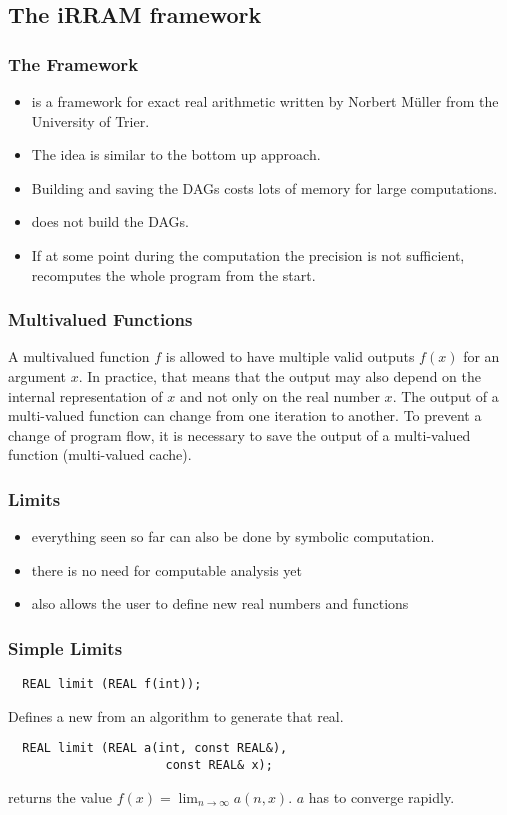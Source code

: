 \subsection{The iRRAM framework}
\begin{frame}
  \frametitle{The \irram Framework}
  \begin{itemize}[<+->]
    \item \irram is a \cc framework for exact real arithmetic written by Norbert M\"{u}ller from the University of Trier.
      \item The idea is similar to the bottom up approach.
    \item Building and saving the DAGs costs lots of memory for large computations.
    \item \irram does not build the DAGs.
    \item If at some point during the computation the precision is not sufficient, \irram recomputes the whole program from the start.
  \end{itemize}
\end{frame}
\begin{frame}
  \frametitle{Multivalued Functions}
  \large
  A multivalued function $f$ is allowed to have multiple valid outputs $f(x)$ for an argument $x$.
  \pause
  \vfill
  In practice, that means that the output may also depend on the internal representation of $x$
  and not only on the real number $x$.
  \pause
  \vfill
  The output of a multi-valued function can change from one iteration to another.
  To prevent a change of program flow, it is necessary to save the output of a multi-valued function (multi-valued cache).
\end{frame}
\begin{frame}
  \frametitle{Limits}
  \begin{itemize}[<+->]
    \item everything seen so far can also be done by symbolic computation.
    \item there is no need for computable analysis yet
    \item \irram also allows the user to define new real numbers and functions
  \end{itemize}
\end{frame}
\begin{frame}[<+->][fragile]
  \frametitle{Simple Limits}
  \begin{lstlisting}
  REAL limit (REAL f(int));
  \end{lstlisting}
  Defines a new \real from an algorithm to generate that real.
  \vfill
  \pause
  \begin{lstlisting}
  REAL limit (REAL a(int, const REAL&),
                      const REAL& x);
  \end{lstlisting}
  returns the value $f(x) = \lim_{n \to \infty} a(n,x)$.
  $a$ has to converge rapidly.
\end{frame}
